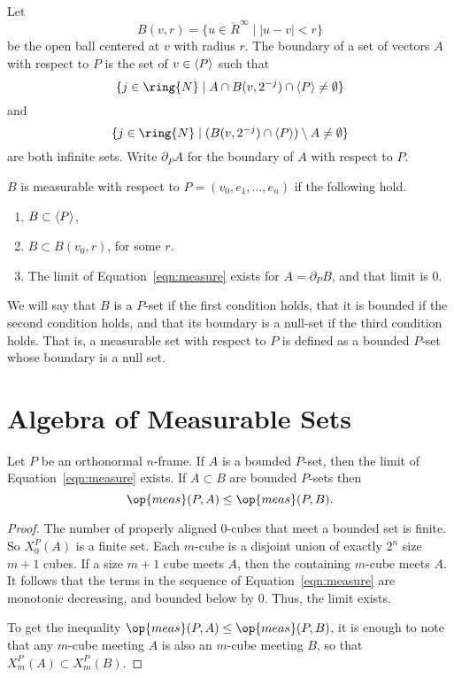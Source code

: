 \begin{definition}
    Let $$B(v,r) = \{u\in \ring{R}^\infty\mid |u - v|< r\}$$ be
    the open ball centered at $v$ with radius $r$.
    The boundary of a set of vectors $A$ with respect to $P$ is the set of
    $v\in {\langle P\rangle}$ such that
        $$\{j\in\ring{N}\mid A \cap B(v,2^{-j})\cap\aspan{P}\ne\emptyset\}$$
    and
        $$\{j\in\ring{N}\mid (B(v,2^{-j})\cap\aspan{P})\setminus A\ne\emptyset\}$$
    are both infinite sets.
    Write $\partial_P A$ for the
    boundary of $A$ with respect to $P$.
\end{definition}

\begin{definition} \label{def:measurable}
    $B$ is measurable with respect to $P=(v_0,e_1,\ldots,e_n)$
    if the following hold.
    \begin{enumerate}
    \item $B \subset {\langle P\rangle}$,
    \item $B \subset B(v_0,r)$, for some $r$.
    \item The limit of Equation~\ref{eqn:measure} exists for $A = \partial_P B$,
    and that limit is $0$.
    \end{enumerate}
\end{definition}

We will say that $B$ is a $P$-set if the first condition holds, that
it is bounded if the second condition holds, and that its boundary
is a null-set if the third condition holds.   That is, a measurable
set with respect to $P$ is defined as a bounded $P$-set whose
boundary is a null set.


\section{Algebra of Measurable Sets}

\begin{lemma}\label{lemma:meas_le}
    Let $P$ be an orthonormal $n$-frame.
    If $A$ is a bounded $P$-set, then the limit of Equation~\ref{eqn:measure}
    exists.  If $A\subset B$ are bounded $P$-sets then
    $$\op{meas}(P,A)\le \op{meas}(P,B).$$
\end{lemma}

\begin{proof}  The number of properly aligned $0$-cubes that meet a
bounded set is finite.  So $X^P_0(A)$ is a finite set.  Each
$m$-cube is a disjoint union of exactly $2^n$ size $m+1$ cubes. If a
size $m+1$ cube meets $A$, then the containing $m$-cube meets $A$.
It follows that the terms in the sequence of
Equation~\ref{eqn:measure} are monotonic decreasing, and bounded
below by $0$.  Thus, the limit exists.

To get the inequality $\op{meas}(P,A)\le \op{meas}(P,B)$, it is
enough to note that any $m$-cube meeting $A$ is also an $m$-cube
meeting $B$, so that $X^P_m(A) \subset X^P_m(B)$.
\end{proof}

